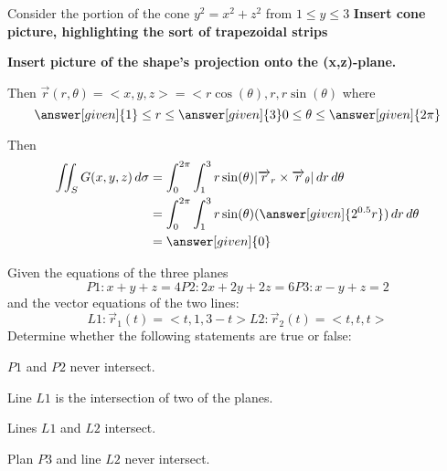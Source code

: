 \documentclass{ximera}
\begin{document}
\begin{example}
Consider the portion of the cone $y^2 = x^2 + z^2$ from $1\leq y \leq 3$ {\bf Insert cone picture, highlighting the sort of trapezoidal strips}

{\bf Insert picture of the shape's projection onto the (x,z)-plane.}

Then $\overrightarrow{r}(r,\theta) = < x,y,z> =<r\cos(\theta), r, r\sin(\theta)$ where
\[
\answer[given]{1}\leq r \leq \answer[given]{3}
0\leq \theta \leq \answer[given]{2\pi}
\]

Then 
    \begin{align*}
     \iint_S G(x,y,z) \d \sigma &= \int_0^{2\pi} \int_1^3 r\sin(\theta) | \overrightarrow{r}_r \times \overrightarrow{r}_\theta | \d r \d \theta \\
     &= \int_0^{2\pi} \int_1^3 r\sin(\theta) (\answer[given]{2^{0.5} r})\d r \d \theta \\
     &= \answer[given]{0}
    \end{align*}
\end{example}



\begin{question}
Given the equations of the three planes
\[
P1: x+y+z = 4
P2 : 2x+2y+2z=6
P3: x-y+z=2
\]
and the vector equations of the two lines:
\[
L1: \vec{r}_1(t) = <t, 1, 3-t>
L2: \vec{r}_2(t) = <t,t,t>
\]
Determine whether the following statements are true or false:

$P1$ and $P2$ never intersect.
\begin{multipleChoice}
\end{multipleChoice}

Line $L1$ is the intersection of two of the planes.
\begin{multipleChoice}
\end{multipleChoice}

Lines $L1$ and $L2$ intersect.
\begin{multipleChoice}
\end{multipleChoice}

Plan $P3$ and line $L2$ never intersect.
\begin{multipleChoice}
\end{multipleChoice}
\end{question}
\end{document}
